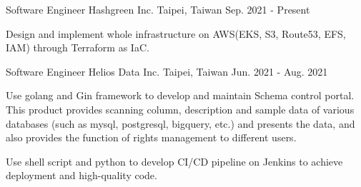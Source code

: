 

\begin{cventries}

\cventry
{Software Engineer} %
{Hashgreen Inc.} %
{Taipei, Taiwan} %
{Sep. 2021 - Present} %
{
  \begin{cvitems} %
    \item {Design and implement whole infrastructure on AWS(EKS, S3, Route53, EFS, IAM) through Terraform as IaC.}
  \end{cvitems}
}

\cventry
{Software Engineer} %
{Helios Data Inc.} %
{Taipei, Taiwan} %
{Jun. 2021 - Aug. 2021} %
{
  \begin{cvitems} %
    \item {Use golang and Gin framework to develop and maintain Schema control portal. This product provides scanning column, description and sample data of various databases (such as mysql, postgresql, bigquery, etc.) and presents the data, and also provides the function of rights management to different users.}
    \item {Use shell script and python to develop CI/CD pipeline on Jenkins to achieve deployment and high-quality code.}
  \end{cvitems}
}


\end{cventries}
